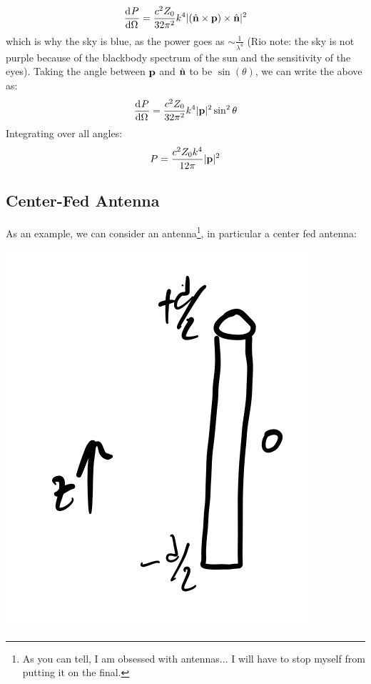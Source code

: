 \begin{equation}
    \dod{P}{\Omega} = \frac{c^2Z_0}{32\pi^2}k^4\abs{(\hat{\v{n}} \times \v{p}) \times \hat{\v{n}}}^2
\end{equation}
which is why the sky is blue, as the power goes as $\sim \frac{1}{\lambda^4}$ (Rio note: the sky is not purple because of the blackbody spectrum of the sun and the sensitivity of the eyes). Taking the angle between $\mathbf{p}$ and $\hat{\mathbf{n}}$ to be $\sin(\theta)$, we can write the above as:
\begin{equation}
    \dod{P}{\Omega} = \frac{c^2Z_0}{32\pi^2}k^4\abs{\v{p}}^2\sin^2\theta
\end{equation}
Integrating over all angles:
\begin{equation}
    P = \frac{c^2Z_0k^4}{12\pi}\lvert \mathbf{p} \rvert^2
\end{equation}

\subsection{Center-Fed Antenna}
As an example, we can consider an antenna\footnote{As you can tell, I am obsessed with antennas... I will have to stop myself from putting it on the final.}, in particular a center fed antenna:

\begin{center}
    \includegraphics[scale=0.35]{Lectures/Images/lec11-antenna.png}
\end{center}

